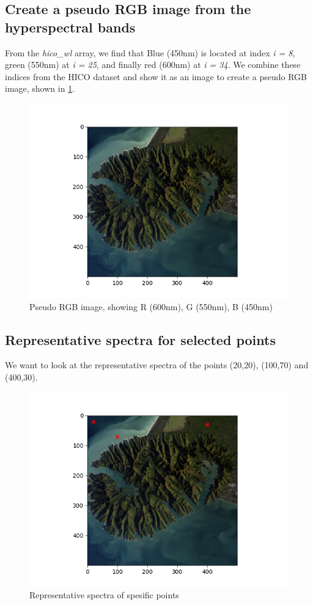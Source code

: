 \subsection{Create a pseudo RGB image from the hyperspectral bands}

From the \textit{hico\_wl} array, we find that Blue (450nm) is located at index \textit{i = 8}, 
green (550nm) at \textit{i = 25}, and finally red (600nm) at \textit{i = 34}. We combine these indices from 
the HICO dataset and show it as an image to create a pseudo RGB image, shown in \cref{fig:pseudo_rgb}.


\begin{figure}
    \centering
    \includegraphics[width=\textwidth]{../fig/pseudo_rgb.png}
    \caption{Pseudo RGB image, showing R (600nm), G (550nm), B (450nm)}
    \label{fig:pseudo_rgb}
\end{figure}

\subsection{Representative spectra for selected points}

We want to look at the representative spectra of the points (20,20), (100,70) and (400,30).


\begin{figure}
    \centering
    \includegraphics[width=\textwidth]{../fig/pseudo_rgb_points.png}
    \caption{Representative spectra of spesific points}
    \label{fig:point_spectra}
\end{figure}

